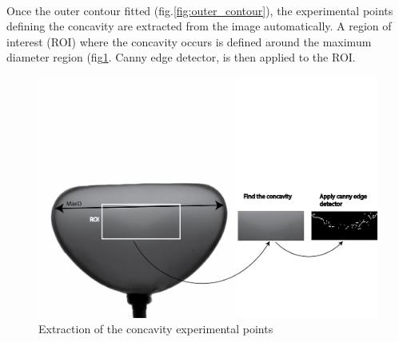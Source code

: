 \paragraph{}
Once the outer contour fitted (fig.\ref{fig:outer_contour}), the experimental points defining the concavity are extracted from the image automatically. A region of interest (ROI) where the concavity occurs is defined around the maximum diameter region (fig\ref{fig:concavity_extraction}. Canny edge detector, is then applied to the ROI.
\begin{figure}[H] %
	\centering%
  \includegraphics[width=\textwidth]{figures/Chapter_1/concavity_extraction.png}
	\caption{Extraction of the concavity experimental points}
	\label{fig:concavity_extraction}
\end{figure}
